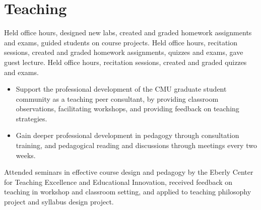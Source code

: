 \documentclass[11pt,a4paper,sans]{moderncv} %
\begin{document}





\section{Teaching}
 {}{}{}
 {}{}{
Held office hours, designed new labs, created and graded homework assignments and exams, guided students on course projects.}%
 {}{}{
Held office hours, recitation sessions, created and graded homework assignments, quizzes and exams, gave guest lecture.}
 {}{}{
Held office hours, recitation sessions, created and graded quizzes and exams.}

 {}{}{
\begin{itemize}
\item Support the professional development of the CMU graduate student community as a teaching peer consultant, by providing classroom observations, facilitating workshops, and providing feedback on teaching strategies. 
\item Gain deeper professional development in pedagogy through consultation training, and pedagogical reading and discussions through meetings every two weeks.
\end{itemize}}
 {}{}{
Attended seminars in effective course design and pedagogy by the Eberly Center for Teaching Excellence and Educational Innovation, received feedback on teaching in workshop and classroom setting, and applied to teaching philosophy project and syllabus design project.
}
\end{document}
